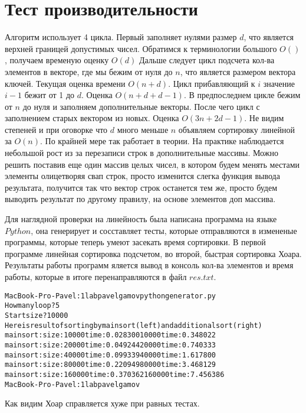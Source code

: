 \section{Тест производительности}

Алгоритм использует 4 цикла. Первый заполняет нулями размер $d$, что является верхней границей допустимых чисел. Обратимся к терминологии большого $O()$, получаем временую оценку $O(d)$ Дальше следует цикл подсчета кол-ва элементов в векторе, где мы бежим от нуля до $n$, что является размером вектора ключей. Текущая оценка времени $O(n + d)$. Цикл прибавляющий к $i$ значение $i - 1$ бежит от 1 до $d$. Оценка $O(n + d + d - 1)$. В предпоследнем цикле бежим от $n$ до нуля и заполняем дополнительные векторы. После чего цикл с заполнением старых вектором из новых. Оценка $O(3n + 2d - 1)$. Не видим степеней и при оговорке что $d$ много меньше $n$ объявляем сортировку линейной за $O(n)$. По крайней мере так работает в теории. На практике наблюдается небольшой рост из за перезаписи строк в дополнительные массивы. Можно решить поставив еще один массив целых чисел, в котором будем менять местами элементы олицетворяя свап строк, просто изменится слегка функция вывода результата, получится так что вектор строк останется тем же, просто будем выводить результат по другому правилу, на основе элементов доп массива.


Для наглядной проверки на линейность была написана программа на языке $Python$, она генерирует и сосставляет тесты, которые отправляются в измененые программы, которые теперь умеют засекать время сортировки. В первой программе линейная сортировка подсчетом, во второй, быстрая сортировка Хоара.
Результаты работы программ яляется вывод в консоль кол-ва элементов и время работы, которые в итоге перенаправляются в файл $res.txt$.

\begin{alltt}
MacBook-Pro-Pavel:1lab pavelgamov python generator.py 
How many loop?	5
Start size?	10000
Here is result of sorting by main sort (left) and additional sort (right)
main sort: size: 10000	time:  0.028300		10000	time:  0.348022
main sort: size: 20000	time:  0.049244		20000	time:  0.740333
main sort: size: 40000	time:  0.099339		40000	time:  1.617800
main sort: size: 80000	time:  0.220949		80000	time:  3.468129
main sort: size: 160000	time:  0.370362		160000	time:  7.456386
MacBook-Pro-Pavel:1lab pavelgamov
\end{alltt}

Как видим Хоар справляется хуже при равных тестах.

\begin{alltt}

\end{alltt}

\pagebreak
